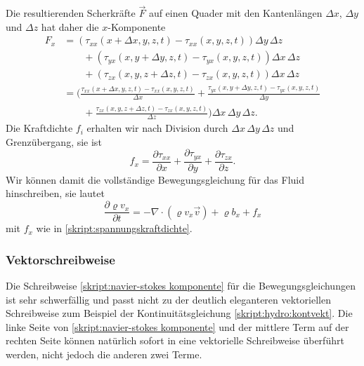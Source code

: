 Die resultierenden Scherkräfte $\vec{F}$ auf einen Quader mit den Kantenlängen
$\Delta x$, $\Delta y$ und $\Delta z$  hat daher die $x$-Komponente
\begin{align*}
F_x
&=
(
\tau_{xx}(x+\Delta x,y,z,t)
-
\tau_{xx}(x,y,z,t)
) \Delta y\,\Delta z
\\
&\qquad
+
(
\tau_{yx}(x,y+\Delta y,z,t)
-
\tau_{yx}(x,y,z,t)
) \Delta x\,\Delta z
\\
&\qquad
+
(
\tau_{zx}(x,y,z+\Delta z,t)
-
\tau_{zx}(x,y,z,t)
)\Delta x\,\Delta z
\\
&=
\bigg(
\frac{
\tau_{xx}(x+\Delta x,y,z,t)
-
\tau_{xx}(x,y,z,t)
}{\Delta x}
+
\frac{
\tau_{yx}(x,y+\Delta y,z,t)
-
\tau_{yx}(x,y,z,t)
}{\Delta y}
\\
&\qquad
+
\frac{
\tau_{zx}(x,y,z+\Delta z,t)
-
\tau_{zx}(x,y,z,t)
}{\Delta z}
\bigg)
\Delta x\,\Delta y\,\Delta z.
\end{align*}
Die Kraftdichte $f_i$ erhalten wir nach Division durch
$\Delta x\,\Delta y\,\Delta z$ und Grenzübergang, sie ist
\begin{equation}
f_x
=
\frac{\partial \tau_{xx}}{\partial x}
+
\frac{\partial \tau_{yx}}{\partial y}
+
\frac{\partial \tau_{zx}}{\partial z}.
\label{skript:spannungskraftdichte}
\end{equation}
Wir können damit die vollständige Bewegungsgleichung für das Fluid
hinschreiben, sie lautet
\begin{equation}
\frac{\partial \varrho v_x}{\partial t}
=
-\nabla\cdot (\varrho v_x\vec{v})
+
\varrho b_x
+
f_x
\label{skript:navier-stokes komponente}
\end{equation}
mit $f_x$ wie in \eqref{skript:spannungskraftdichte}.

\subsubsection{Vektorschreibweise}
Die Schreibweise
\eqref{skript:navier-stokes komponente}
für die Bewegungsgleichungen ist sehr schwerfällig und passt nicht
zu der deutlich eleganteren vektoriellen Schreibweise zum Beispiel
der Kontinuitätsgleichung \eqref{skript:hydro:kontvekt}.
Die linke Seite von
\eqref{skript:navier-stokes komponente}
und der mittlere Term auf der rechten Seite können natürlich sofort
in eine vektorielle Schreibweise überführt werden, nicht jedoch die
anderen zwei Terme.

